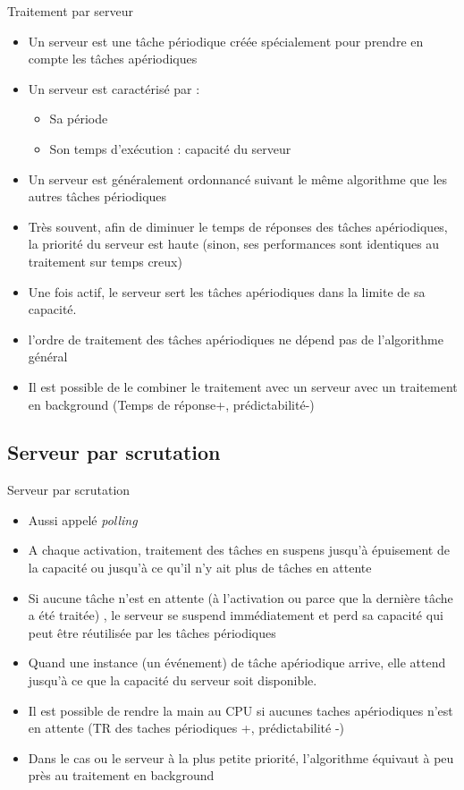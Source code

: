 \begin{frame}{Traitement par serveur}
  \begin{itemize}
  \item Un  serveur est une  tâche périodique créée  spécialement pour
    prendre en compte les tâches apériodiques
  \item Un serveur est caractérisé par :
    \begin{itemize}
    \item Sa période
    \item Son temps d'exécution : capacité du serveur
    \end{itemize}
  \item Un serveur est généralement ordonnancé suivant  le même algorithme
    que les autres tâches périodiques
  \item Très  souvent, afin  de diminuer le  temps de  réponses des tâches
    apériodiques,  la  priorité  du   serveur  est  haute  (sinon,  ses
    performances sont identiques au traitement sur temps creux)
  \item Une fois actif, le serveur sert les tâches apériodiques dans
    la limite de sa capacité.
  \item l'ordre de traitement  des tâches apériodiques ne dépend pas
    de l'algorithme général
  \item Il est  possible de le combiner le  traitement avec un serveur
    avec   un   traitement   en   background   (Temps   de   réponse+,
    prédictabilité-)
  \end{itemize}
\end{frame}

\subsection{Serveur par scrutation}

\begin{frame}{Serveur par scrutation}
  \begin{itemize}
  \item Aussi appelé \emph{polling}
  \item A chaque activation,  traitement des tâches en suspens jusqu'à
    épuisement  de la capacité  ou jusqu'à  ce qu'il  n'y ait  plus de
    tâches en attente
  \item Si aucune tâche n'est  en attente (à l'activation ou parce que
    la  dernière  tâche  a  été  traitée)  ,  le  serveur  se  suspend
    immédiatement et perd sa capacité qui peut être réutilisée par les
    tâches périodiques
  \item Quand une instance (un événement) de tâche apériodique arrive,
    elle attend jusqu’à ce que la capacité du serveur soit disponible.
  \item  Il est  possible de  rendre la  main au  CPU si  aucunes taches
    apériodiques  n'est  en  attente  (TR  des  taches  périodiques  +,
    prédictabilité -)
  \item  Dans  le  cas  ou  le  serveur à  la  plus  petite  priorité,
    l'algorithme équivaut à peu près au traitement en background
  \end{itemize}
\end{frame}

